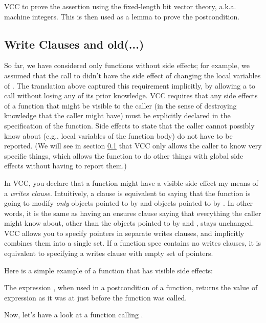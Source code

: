 \noindent
VCC to prove the assertion using the fixed-length bit vector theory, a.k.a. machine integers.
This is then used as a lemma to prove the postcondition.


\subsection{Write Clauses and old(...)}
So far, we have considered only functions without side effects; for
example, we assumed that the call to  didn't have the side
effect of changing the local variables of . The
translation above captured this requirement implicitly, by allowing a
 to call  without losing any of its prior
knowledge. VCC requires that any side effects of a function that might
be visible to the caller (in the sense of destroying knowledge that
the caller might have) must be explicitly declared in the
specification of the function. Side effects to state that the caller
cannot possibly know about (e.g., local variables of the function
body) do not have to be reported. (We will see in section \ref{} that
VCC only allows the caller to know very specific things, which allows
the function to do other things with global side effects without
having to report them.)

In VCC, you declare that a function might have a visible side effect
my means of a \emph{writes clause}. 
Intuitively, a clause  is equivalent to saying
that the function is going to modify \emph{only} objects pointed to by 
and objects pointed to by .
In other words, it is the same as having an ensures clause
saying that everything the caller might know about, other than the objects
pointed to by  and , stays unchanged. VCC allows you
to specify pointers in separate writes clauses, and implicitly
combines them into a single set. If a function spec contains no writes clauses, 
it is equivalent to specifying a writes clause with empty set of pointers.

Here is a simple example of a function that has visible side effects:

\noindent
The expression , when used in a postcondition of a function,
returns the value of expression 
as it was at just before the function was called. 

Now, let's have a look at a function calling .


